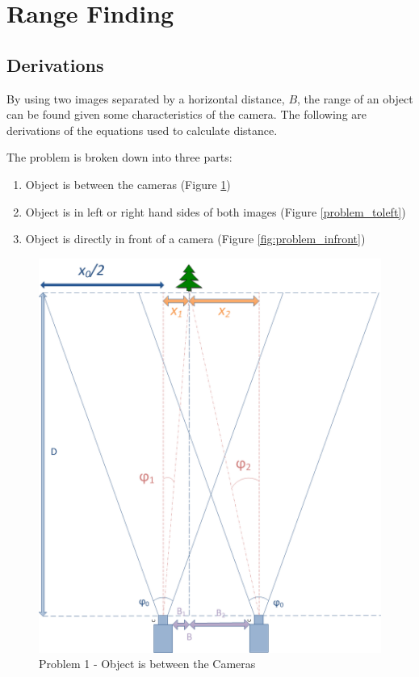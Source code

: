 \section{Range Finding}
\subsection{Derivations}

By using two images separated by a horizontal distance, $B$, the range of an object can be found given some characteristics of the camera. The following are derivations of the equations used to calculate distance. 

The problem is broken down into three parts:
\begin{enumerate}
\item Object is between the cameras (Figure \ref{problem_between})
\item Object is in left or right hand sides of both images (Figure \ref{problem_toleft})
\item Object is directly in front of a camera (Figure \ref{fig:problem_infront})
\end{enumerate}

\begin{figure}
\includegraphics[width=\textwidth,height=\textheight,keepaspectratio]{Figures/problem1.png}
\caption{Problem 1 - Object is between the Cameras}
\label{problem_between}
\end{figure}

